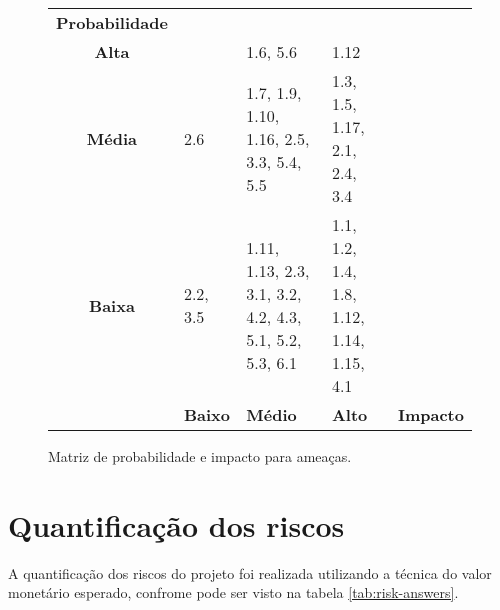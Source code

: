 \begin{figure}[h]
	\begin{tabularx}{\textwidth}{ c | >{\centering\arraybackslash}X >{\centering\arraybackslash}X >{\centering\arraybackslash}X l}
		\textbf{Probabilidade} &                                     &                                       &                                  &                  \\
		\cellcolor{red!30!}\textbf{Alta} &
		\cellcolor{yellow!10!} &
		\cellcolor{red!10!} 1.6, 5.6  &
		\cellcolor{red!10!} 1.12  &   \\
		\cellcolor{yellow!30!}\textbf{Média}&
		\cellcolor{green!10!} 2.6 &
		\cellcolor{yellow!10!} 1.7, 1.9, 1.10, 1.16, 2.5, 3.3, 5.4, 5.5 &
		\cellcolor{red!10!} 1.3, 1.5, 1.17, 2.1, 2.4, 3.4 &   \\
		\cellcolor{green!30!}\textbf{Baixa}&
		\cellcolor{green!10!} 2.2, 3.5 &
		\cellcolor{green!10!} 1.11, 1.13, 2.3, 3.1, 3.2, 4.2, 4.3, 5.1, 5.2, 5.3, 6.1 &
		\cellcolor{yellow!10!} 1.1, 1.2, 1.4, 1.8, 1.12, 1.14, 1.15, 4.1 &   \\
		\hline
		                       & \cellcolor{green!30!}\textbf{Baixo} & \cellcolor{yellow!30!}\textbf{Médio} & \cellcolor{red!30!}\textbf{Alto} & \textbf{Impacto} \\
	\end{tabularx}
	\caption{Matriz de probabilidade e impacto para ameaças.}
	\label{fig:probability-impact-matrix-threats}
	\centering
\end{figure}

\section{Quantificação dos riscos}
\label{sec:risk-quantification}

A quantificação dos riscos do projeto foi realizada utilizando a técnica do valor monetário esperado, confrome pode ser visto na tabela \ref{tab:risk-answers}.


